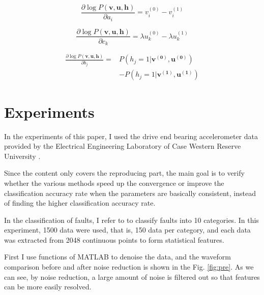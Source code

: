 \documentclass{bioinfo}
\begin{document}
\begin{equation}
\frac{\partial \log P(\boldsymbol{v}, \boldsymbol{u}, \boldsymbol{h})}{\partial a_{i}}=v_i^{(0)}-v_i^{(1)}
\end{equation}

\begin{equation}
\frac{\partial \log P(\boldsymbol{v}, \boldsymbol{u}, \boldsymbol{h})}{\partial c_{k}}=\lambda u_k^{(0)}-\lambda u_k^{(1)}
\end{equation}

\begin{equation}
\begin{aligned} 
\frac{\partial \log P(\boldsymbol{v}, \boldsymbol{u}, \boldsymbol{h})}{\partial b_{j}}=&P(h_j=1|\boldsymbol{v^{(0)}},\boldsymbol{u^{(0)}})\\&-P(h_j=1|\boldsymbol{v^{(1)}},\boldsymbol{u^{(1)}})
\end{aligned}
\end{equation}

\section{Experiments}
In the experiments of this paper, I used the drive end bearing accelerometer data provided by the Electrical Engineering Laboratory of Case Western Reserve University \cite{data}. 

Since the content only covers the reproducing part, the main goal is to verify whether the various methods speed up the convergence or improve the classification accuracy rate when the parameters are basically consistent, instead of finding the higher classification accuracy rate.

In the classification of faults, I refer to \cite{guangquan2016fault} to classify faults into 10 categories. In this experiment, 1500 data were used, that is, 150 data per category, and each data was extracted from 2048 continuous points to form statistical features.

First I use functions of MATLAB to denoise the data, and the waveform comparison before and after noise reduction is shown in the Fig. \ref{fig:pre}. As we can see, by noise reduction, a large amount of noise is filtered out so that features can be more easily resolved.
\end{document}
